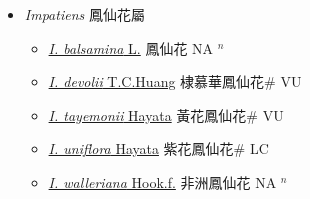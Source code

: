 
  \begin{itemize}
 \item[] \textit{Impatiens} 鳳仙花屬
                    
  \begin{itemize}
        \item[] \href{http://www.theplantlist.org/tpl1.1/search?q=Impatiens+balsamina}{\textit{I. balsamina} L.}   鳳仙花 NA $^n$
        \item[] \href{http://www.theplantlist.org/tpl1.1/search?q=Impatiens+devolii}{\textit{I. devolii} T.C.Huang}   棣慕華鳳仙花\# VU
        \item[] \href{http://www.theplantlist.org/tpl1.1/search?q=Impatiens+tayemonii}{\textit{I. tayemonii} Hayata}   黃花鳳仙花\# VU
        \item[] \href{http://www.theplantlist.org/tpl1.1/search?q=Impatiens+uniflora}{\textit{I. uniflora} Hayata}   紫花鳳仙花\# LC
        \item[] \href{http://www.theplantlist.org/tpl1.1/search?q=Impatiens+walleriana}{\textit{I. walleriana} Hook.f.}   非洲鳳仙花 NA $^n$
  \end{itemize}
  \end{itemize}
